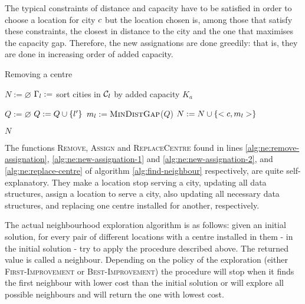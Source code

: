 \hfill

The typical constraints of distance and capacity have to be satisfied in order to choose a
location for city $c$ but the location chosen is, among those that satisfy these
constraints, the closest in distance to the city and the one that maximises the capacity gap.
Therefore, the new assignations are done greedily: that is, they are done in increasing order
of added capacity.

\hfill

\begin{algorithm}[H]
    \label{alg:can-remove-centre}
    \DontPrintSemicolon
    
    \caption{Removing a centre}
    
     {
        $N := \varnothing$\;
        $\Gamma_l := $ sort cities in $\mathcal{C}_l$ by added capacity $K_a$\;
        
        \For {$\icity \in \Gamma_\iloc$} {
            $Q := \varnothing$\;
             {
                 {
                    $Q := Q \cup \{l'\}$
                }
            }
             {
                $m_l := \textsc{MinDistGap}$($Q$)\;
                $N := N \cup \{ < c, m_l > \} $\;
            }
        }
        
        \Return $N$
    }
\end{algorithm}

\hfill

The functions \textsc{Remove}, \textsc{Assign} and \textsc{ReplaceCentre} found in lines
\ref{alg:ne:remove-assignation}, \ref{alg:ne:new-assignation-1} and
\ref{alg:ne:new-assignation-2}, and \ref{alg:ne:replace-centre} of algorithm
\ref{alg:find-neighbour} respectively, are quite self-explanatory. They make a location
stop serving a city, updating all data structures, assign a location to serve a city, also
updating all necessary data structures, and replacing one centre installed for another,
respectively.

\hfill

The actual neighbourhood exploration algorithm is as follows: given an initial solution, for
every pair of different locations with a centre installed in them - in the initial solution -
try to apply the procedure described above. The returned value is called a neighbour.
Depending on the policy of the exploration (either \textsc{First-Improvement} or
\textsc{Best-Improvement}) the procedure will stop when it finds the first neighbour with
lower cost than the initial solution or will explore all possible neighbours and will return
the one with lowest cost.

